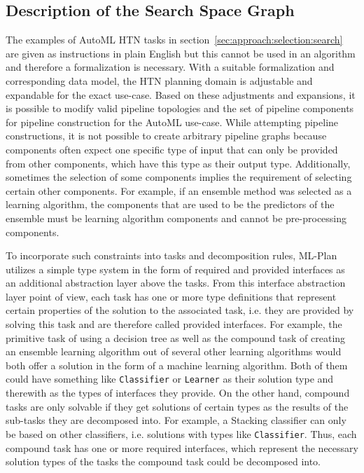 \subsection{Description of the Search Space Graph}
\label{sec:approach:selection:graph}
The examples of AutoML HTN tasks in section~\ref{sec:approach:selection:search} are given as instructions in plain English but this cannot be used in an algorithm and therefore a formalization is necessary.
With a suitable formalization and corresponding data model, the HTN planning domain is adjustable and expandable for the exact use-case.
Based on these adjustments and expansions, it is possible to modify valid pipeline topologies and the set of pipeline components for pipeline construction for the AutoML use-case.\newline
While attempting pipeline constructions, it is not possible to create arbitrary pipeline graphs because components often expect one specific type of input that can only be provided from other components, which have this type as their output type.
Additionally, sometimes the selection of some components implies the requirement of selecting certain other components.
For example, if an ensemble method was selected as a learning algorithm, the components that are used to be the predictors of the ensemble must be learning algorithm components and cannot be pre-processing components.

To incorporate such constraints into tasks and decomposition rules, ML-Plan utilizes a simple type system in the form of required and provided interfaces as an additional abstraction layer above the tasks.
From this interface abstraction layer point of view, each task has one or more type definitions that represent certain properties of the solution to the associated task, i.e. they are provided by solving this task and are therefore called provided interfaces.
For example, the primitive task of using a decision tree as well as the compound task of creating an ensemble learning algorithm out of several other learning algorithms would both offer a solution in the form of a machine learning algorithm.
Both of them could have something like \texttt{Classifier} or \texttt{Learner} as their solution type and therewith as the types of interfaces they provide.\newline
On the other hand, compound tasks are only solvable if they get solutions of certain types as the results of the sub-tasks they are decomposed into.
For example, a Stacking classifier can only be based on other classifiers, i.e. solutions with types like \texttt{Classifier}.
Thus, each compound task has one or more required interfaces, which represent the necessary solution types of the tasks the compound task could be decomposed into.

